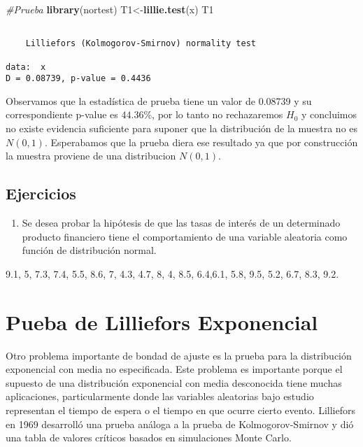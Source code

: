 \documentclass[a4paper,oneside,openany]{book}
\newenvironment{Shaded}{\begin{snugshade}}{\end{snugshade}}
\newcommand{\KeywordTok}[1]{\textcolor[rgb]{0.13,0.29,0.53}{\textbf{#1}}}
\newcommand{\CommentTok}[1]{\textcolor[rgb]{0.56,0.35,0.01}{\textit{#1}}}
\newcommand{\NormalTok}[1]{#1}
\providecommand{\tightlist}{%
  \setlength{\itemsep}{0pt}\setlength{\parskip}{0pt}}
\begin{document}
\begin{Shaded}
\begin{Highlighting}[]
\CommentTok{#Prueba}
\KeywordTok{library}\NormalTok{(nortest) }
\NormalTok{T1<-}\KeywordTok{lillie.test}\NormalTok{(x)}
\NormalTok{T1}
\end{Highlighting}
\end{Shaded}

\begin{verbatim}

    Lilliefors (Kolmogorov-Smirnov) normality test

data:  x
D = 0.08739, p-value = 0.4436
\end{verbatim}

Observamos que la estadística de prueba tiene un valor de 0.08739 y su
correspondiente p-value es \(44.36\%\), por lo tanto no rechazaremos
\(H_0\) y concluimos no existe evidencia suficiente para suponer que la
distribución de la muestra no es \(N(0,1)\). Esperabamos que la prueba
diera ese resultado ya que por construcción la muestra proviene de una
distribucion \(N(0,1)\).

\section{Ejercicios}\label{ejercicios-16}

\begin{enumerate}
\def\labelenumi{\arabic{enumi}.}
\tightlist
\item
  Se desea probar la hipótesis de que las tasas de interés de un
  determinado producto financiero tiene el comportamiento de una
  variable aleatoria como función de distribución normal.
\end{enumerate}

9.1, 5, 7.3, 7.4, 5.5, 8.6, 7, 4.3, 4.7, 8, 4, 8.5, 6.4,6.1, 5.8, 9.5,
5.2, 6.7, 8.3, 9.2.

\chapter{Pueba de Lilliefors
Exponencial}\label{pueba-de-lilliefors-exponencial}

Otro problema importante de bondad de ajuste es la prueba para la
distribución exponencial con media no especificada. Este problema es
importante porque el supuesto de una distribución exponencial con media
desconocida tiene muchas aplicaciones, particularmente donde las
variables aleatorias bajo estudio representan el tiempo de espera o el
tiempo en que ocurre cierto evento. Lilliefors en 1969 desarrolló una
prueba análoga a la prueba de Kolmogorov-Smirnov y dió una tabla de
valores críticos basados en simulaciones Monte Carlo.
\end{document}
